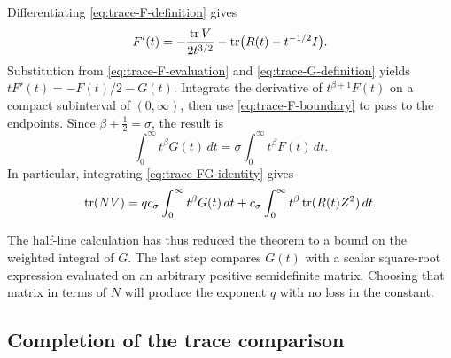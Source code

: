 Differentiating \eqref{eq:trace-F-definition} gives
\[
 F'(t)=-\frac{\operatorname{tr} V}{2t^{3/2}}
          -\operatorname{tr}\bigl(R(t)-t^{-1/2}I\bigr).
\]
Substitution from \eqref{eq:trace-F-evaluation} and
\eqref{eq:trace-G-definition} yields
$tF'(t)=-F(t)/2-G(t)$.  Integrate the derivative of
$t^{\beta+1}F(t)$ on a compact subinterval of $(0,\infty)$,
then use \eqref{eq:trace-F-boundary} to pass to the endpoints.
Since $\beta+\tfrac12=\sigma$, the result is
\begin{equation}\label{eq:trace-weighted-balance}
 \int_0^\infty t^\beta G(t)\,dt
       =\sigma\int_0^\infty t^\beta F(t)\,dt.
\end{equation}
In particular, integrating \eqref{eq:trace-FG-identity} gives
\begin{equation}\label{eq:trace-weighted-identity}
 \operatorname{tr}(NV)
   =q c_\sigma\int_0^\infty t^\beta G(t)\,dt
      +c_\sigma\int_0^\infty t^\beta\operatorname{tr}(R(t)Z^2)\,dt.
\end{equation}

The half-line calculation has thus reduced the theorem to a bound
on the weighted integral of $G$.  The last step compares $G(t)$
with a scalar square-root expression evaluated on an arbitrary
positive semidefinite matrix.  Choosing that matrix in terms of
$N$ will produce the exponent $q$ with no loss in the constant.

\subsection{Completion of the trace comparison}

